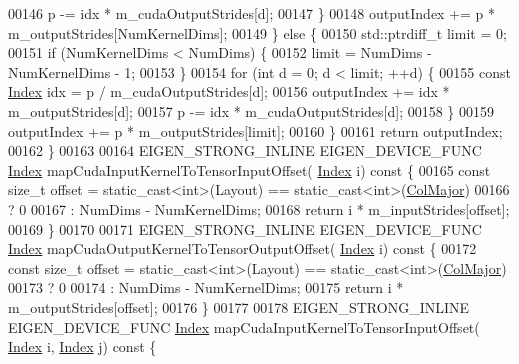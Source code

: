 \begin{DoxyCode}
00146         p -= idx * m\_cudaOutputStrides[d];
00147       \}
00148       outputIndex += p * m\_outputStrides[NumKernelDims];
00149     \} \textcolor{keywordflow}{else} \{
00150       std::ptrdiff\_t limit = 0;
00151       \textcolor{keywordflow}{if} (NumKernelDims < NumDims) \{
00152         limit = NumDims - NumKernelDims - 1;
00153       \}
00154       \textcolor{keywordflow}{for} (\textcolor{keywordtype}{int} d = 0; d < limit; ++d) \{
00155         \textcolor{keyword}{const} \hyperlink{namespace_eigen_a62e77e0933482dafde8fe197d9a2cfde}{Index} idx = p / m\_cudaOutputStrides[d];
00156         outputIndex += idx * m\_outputStrides[d];
00157         p -= idx * m\_cudaOutputStrides[d];
00158       \}
00159       outputIndex += p * m\_outputStrides[limit];
00160     \}
00161     \textcolor{keywordflow}{return} outputIndex;
00162   \}
00163 
00164   EIGEN\_STRONG\_INLINE EIGEN\_DEVICE\_FUNC \hyperlink{namespace_eigen_a62e77e0933482dafde8fe197d9a2cfde}{Index} mapCudaInputKernelToTensorInputOffset(
      \hyperlink{namespace_eigen_a62e77e0933482dafde8fe197d9a2cfde}{Index} i)\textcolor{keyword}{ const }\{
00165     \textcolor{keyword}{const} \textcolor{keywordtype}{size\_t} offset = \textcolor{keyword}{static\_cast<}\textcolor{keywordtype}{int}\textcolor{keyword}{>}(Layout) == static\_cast<int>(\hyperlink{group__enums_ggaacded1a18ae58b0f554751f6cdf9eb13a0cbd4bdd0abcfc0224c5fcb5e4f6669a}{ColMajor})
00166                               ? 0
00167                               : NumDims - NumKernelDims;
00168     \textcolor{keywordflow}{return} i * m\_inputStrides[offset];
00169   \}
00170 
00171   EIGEN\_STRONG\_INLINE EIGEN\_DEVICE\_FUNC \hyperlink{namespace_eigen_a62e77e0933482dafde8fe197d9a2cfde}{Index} mapCudaOutputKernelToTensorOutputOffset(
      \hyperlink{namespace_eigen_a62e77e0933482dafde8fe197d9a2cfde}{Index} i)\textcolor{keyword}{ const }\{
00172     \textcolor{keyword}{const} \textcolor{keywordtype}{size\_t} offset = \textcolor{keyword}{static\_cast<}\textcolor{keywordtype}{int}\textcolor{keyword}{>}(Layout) == static\_cast<int>(\hyperlink{group__enums_ggaacded1a18ae58b0f554751f6cdf9eb13a0cbd4bdd0abcfc0224c5fcb5e4f6669a}{ColMajor})
00173                               ? 0
00174                               : NumDims - NumKernelDims;
00175     \textcolor{keywordflow}{return} i * m\_outputStrides[offset];
00176   \}
00177 
00178   EIGEN\_STRONG\_INLINE EIGEN\_DEVICE\_FUNC \hyperlink{namespace_eigen_a62e77e0933482dafde8fe197d9a2cfde}{Index} mapCudaInputKernelToTensorInputOffset(
      \hyperlink{namespace_eigen_a62e77e0933482dafde8fe197d9a2cfde}{Index} i, \hyperlink{namespace_eigen_a62e77e0933482dafde8fe197d9a2cfde}{Index} j)\textcolor{keyword}{ const }\{

\end{DoxyCode}
